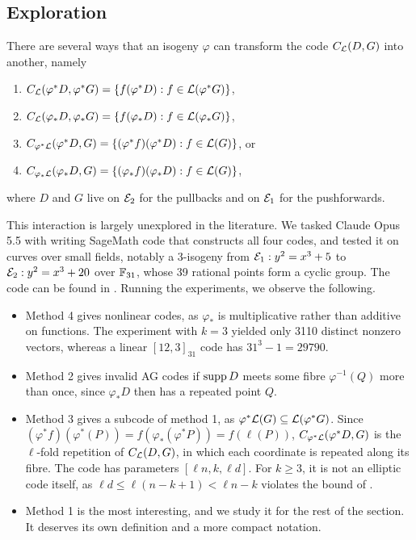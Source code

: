 \documentclass[twocolumn, 11pt]{scrartcl}
\begin{document}
\subsection{Exploration} \label{subsection:exploration}

There are several ways that an isogeny $\varphi$ can transform the code $C_\mathcal{L}(D,G)$ into another, namely
\begin{enumerate}
\item $C_\mathcal{L}(\varphi^*D, \varphi^*G)=\{f(\varphi^*D):f\in\mathcal{L}(\varphi^*G)\}$,
\item $C_\mathcal{L}(\varphi_*D, \varphi_*G)=\{f(\varphi_*D):f\in\mathcal{L}(\varphi_*G)\}$,
\item $C_{\varphi^*\mathcal{L}}(\varphi^*D,G)=\{(\varphi^*f)(\varphi^*D):f\in\mathcal{L}(G)\}$, or
\item $C_{\varphi_*\mathcal{L}}(\varphi_*D,G)=\{(\varphi_*f)(\varphi_*D):f\in\mathcal{L}(G)\}$,
\end{enumerate}
where $D$ and $G$ live on $\mathcal{E}_2$ for the pullbacks and on $\mathcal{E}_1$ for the pushforwards.

This interaction is largely unexplored in the literature. We tasked Claude Opus 5.5 with writing SageMath code that constructs all four codes, and tested it on curves over small fields, notably a 3-isogeny from $\mathcal{E}_1:y^2=x^3+5$ to $\mathcal{E}_2:y^2=x^3+20$ over $\mathbb{F}_{31}$, whose 39 rational points form a cyclic group. The code can be found in \cite{our-github}. Running the experiments, we observe the following.
\begin{itemize}
    \item Method 4 gives nonlinear codes, as $\varphi_*$ is multiplicative rather than additive on functions. The experiment with $k=3$ yielded only 3110 distinct nonzero vectors, whereas a linear $[12,3]_{31}$ code has $31^3-1=29790$.
    \item Method 2 gives invalid AG codes if $\operatorname{supp} D$ meets some fibre $\varphi^{-1}(Q)$ more than once, since $\varphi_*D$ then has a repeated point $Q$.
    \item Method 3 gives a subcode of method 1, as $\varphi^*\mathcal{L}(G)\subseteq\mathcal{L}(\varphi^*G)$. Since $(\varphi^*f)(\varphi^*(P))=f(\varphi_*(\varphi^*P))=f(\ell(P))$, $C_{\varphi^*\mathcal{L}}(\varphi^*D,G)$ is the $\ell$-fold repetition of $C_\mathcal{L}(D,G)$, in which each coordinate is repeated along its fibre. The code has parameters $[\ell n,k,\ell d]$. For $k\geq3$, it is not an elliptic code itself, as $\ell d\leq\ell(n-k+1)<\ell n-k$ violates the bound of .
    \item Method 1 is the most interesting, and we study it for the rest of the section. It deserves its own definition and a more compact notation.
\end{itemize}
\end{document}
